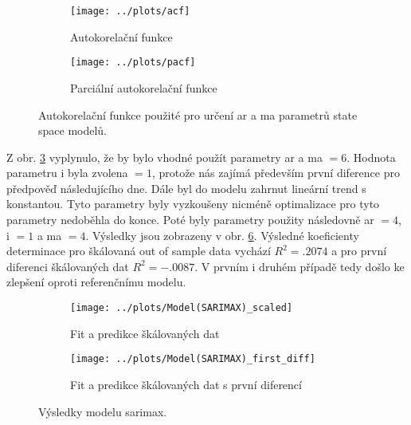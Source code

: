 \documentclass[a4paper,12pt, czech]{article}
\begin{document}
\begin{figure}[htb]
	\begin{subfigure}[t]{1\linewidth}
		\centering
		\texttt{[image: ../plots/acf]}
		\caption{Autokorelační funkce}
		\label{fig:acf}
	\end{subfigure}
	\begin{subfigure}[t]{1\linewidth}
		\centering
		\texttt{[image: ../plots/pacf]}
		\caption{Parciální autokorelační funkce}
		\label{fig:pacf}
	\end{subfigure}
	\caption{Autokorelační funkce použité pro určení \gls{ar} a \gls{ma} parametrů state space modelů.}\label{fig:auto_func}
\end{figure}

Z obr. \ref{fig:auto_func} vyplynulo, že by bylo vhodné použít parametry \gls{ar} a \gls{ma} $= 6$.
Hodnota parametru \gls{i} byla zvolena $= 1$, protože nás zajímá především první diference pro předpověď následujícího dne.
Dále byl do modelu zahrnut lineární trend s konstantou.
Tyto parametry byly vyzkoušeny nicméně optimalizace pro tyto parametry nedoběhla do konce.
Poté byly parametry použity následovně \gls{ar} $= 4$, \gls{i} $= 1$ a \gls{ma} $= 4$.
Výsledky jsou zobrazeny v obr. \ref{fig:sarimax}.
Výsledné koeficienty determinace pro škálovaná out of sample data vychází $R^2=\num{.2074}$ a pro první diferenci škálovaných dat $R^2=\num{-.0087}$.
V prvním i druhém případě tedy došlo ke zlepšení oproti referenčnímu modelu.

\begin{figure}[htb]
	\begin{subfigure}[t]{.5\linewidth}
		\centering
		\texttt{[image: ../plots/Model(SARIMAX)\_scaled]}
		\caption{Fit a predikce škálovaných dat}
		\label{fig:sarimax_scaled}
	\end{subfigure}
	\begin{subfigure}[t]{.5\linewidth}
		\centering
		\texttt{[image: ../plots/Model(SARIMAX)\_first\_diff]}
		\caption{Fit a predikce škálovaných dat s první diferencí}
		\label{fig:sarimax_fd}
	\end{subfigure}
	\caption{Výsledky modelu \gls{sarimax}.}\label{fig:sarimax}
\end{figure}


\clearpage

\subsection{}
\end{document}
